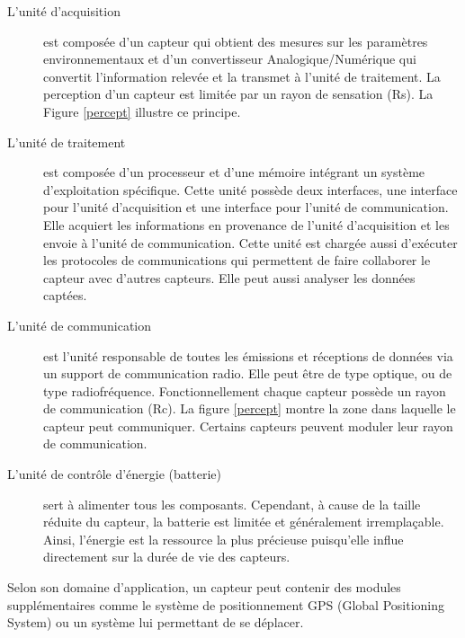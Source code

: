  \begin{description}
\item[L'unité d’acquisition] est composée d’un capteur qui obtient des mesures sur les paramètres environnementaux et d’un convertisseur Analogique/Numérique qui convertit l’information relevée et la transmet à l’unité de traitement. La perception d'un capteur est limitée par un rayon de sensation (Rs). La  Figure \ref{percept} illustre ce principe.

\item[L'unité de traitement] est composée d’un processeur et d’une mémoire intégrant un système d’exploitation spécifique. Cette unité possède deux interfaces, une interface pour l’unité d’acquisition et une interface pour l’unité de communication. Elle acquiert les informations en provenance de l’unité d’acquisition et les envoie à l’unité de communication. Cette unité est chargée aussi d’exécuter les protocoles de communications qui permettent de faire collaborer le capteur avec d’autres capteurs. Elle peut aussi analyser les données captées.

\item[L'unité de communication] est l'unité responsable de toutes les émissions et réceptions de données via un support de communication radio. Elle peut être de type optique, ou de type radiofréquence. Fonctionnellement chaque capteur possède un rayon de communication (Rc). La  figure \ref{percept} montre la zone dans laquelle le capteur peut communiquer. Certains capteurs peuvent moduler leur rayon de communication.

\item[L'unité de contrôle d'énergie (batterie)] sert à alimenter tous les composants. Cependant, à cause de la taille réduite du capteur, la batterie est limitée et généralement irremplaçable. Ainsi, l’énergie est la ressource la plus précieuse puisqu’elle influe directement sur la durée de vie des capteurs.
\end{description}

Selon son domaine d'application, un capteur peut contenir des modules supplémentaires comme le système de positionnement GPS (Global Positioning System) ou un système lui permettant de se déplacer.

